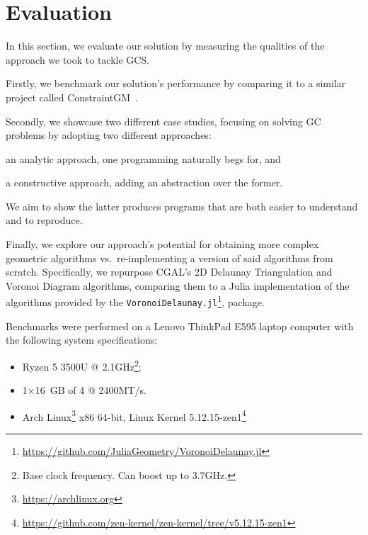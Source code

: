 \section{Evaluation}%
\label{sec:eval}

In this section, we evaluate our solution by measuring the qualities of the
approach we took to tackle \ac{GCS}.

Firstly, we benchmark our solution's performance by comparing it to a
similar project called ConstraintGM~\cite{Pinheiro:2016:MGR}.

Secondly, we showcase two different case studies, focusing on solving \ac{GC}
problems by adopting two different approaches: 
\begin{enumerate*}[label= (\arabic*)]
  \item an analytic approach, one programming naturally begs for, and 
  \item a constructive approach, adding an abstraction over the former.
\end{enumerate*}
We aim to show the latter produces programs that are both easier to understand
and to reproduce.

Finally, we explore our approach's potential for obtaining more complex
geometric algorithms vs.\ re-implementing a version of said algorithms from
scratch.  Specifically, we repurpose \ac{CGAL}'s 2D Delaunay Triangulation and
Voronoi Diagram algorithms, comparing them to a Julia implementation of the
algorithms provided by the
\texttt{VoronoiDelaunay.jl}\footnote{\url{https://github.com/JuliaGeometry/VoronoiDelaunay.jl}},
package.

Benchmarks were performed on a Lenovo{\textregistered}
ThinkPad{\textregistered} E595 laptop computer with the following
system specifications:

\begin{itemize}
  \item {}\label{acro:AMD} Ryzen\textsuperscript{\texttrademark} 5 3500U
  \label{acro:CPU} @ 2.1GHz\footnote{Base clock frequency.  Can boost
  up to 3.7GHz.};
  \item 1×16 GB \label{acro:SO-DIMM} of
  \label{acro:DDR}4 \label{acro:RAM} @ 2400MT/s.
  \item Arch
  Linux\textsuperscript{\texttrademark}\footnote{\url{https://archlinux.org}}
  x86 64-bit, Linux{\textregistered} Kernel
  5.12.15-zen1\footnote{\url{https://github.com/zen-kernel/zen-kernel/tree/v5.12.15-zen1}}
\end{itemize}




